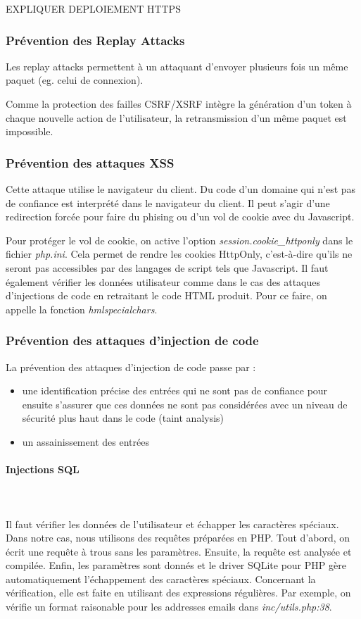\documentclass[a4paper]{article}
\begin{document}
EXPLIQUER DEPLOIEMENT HTTPS

\subsubsection{Prévention des \og Replay Attacks \fg}
Les replay attacks permettent à un attaquant d'envoyer plusieurs fois un
même paquet (eg. celui de connexion).

Comme la protection des failles CSRF/XSRF intègre la génération d'un
token à chaque nouvelle action de l'utilisateur, la retransmission d'un
même paquet est impossible.

\subsubsection{Prévention des attaques XSS}
 		
Cette attaque utilise le navigateur du client. Du code d'un domaine qui
n'est pas de confiance est interprété dans le navigateur du client.
Il peut s'agir d'une redirection forcée pour faire  du phising
ou d'un vol de cookie avec du Javascript.

Pour protéger le vol de cookie, on active l'option \textit{session.cookie\_httponly}
dans le fichier \textit{php.ini}. Cela permet de rendre les cookies HttpOnly,
c'est-à-dire qu'ils ne seront pas accessibles par des langages de script
tels que Javascript. Il faut également vérifier les données utilisateur
comme dans le cas des attaques d'injections de code en retraitant le code
HTML produit. Pour ce faire, on appelle la fonction \textit{hmlspecialchars}.
 		
\subsubsection{Prévention des attaques d'injection de code}
La prévention des attaques d'injection de code passe par :
\begin{itemize}
	\item une identification précise des entrées qui ne sont pas de
		confiance pour ensuite s'assurer que ces données ne sont pas
		considérées avec un niveau de sécurité plus haut dans le code
		(taint analysis) 
	\item un assainissement des entrées
\end{itemize}
		
\paragraph{Injections SQL}
~~\\
\\
Il faut vérifier les données de l'utilisateur et échapper les caractères spéciaux.
Dans notre cas, nous utilisons des requêtes préparées en PHP.
Tout d'abord, on écrit une requête à trous sans les paramètres. Ensuite, la
requête est analysée et compilée. Enfin, les paramètres sont donnés et le driver
SQLite pour PHP gère automatiquement l'échappement des caractères spéciaux.
Concernant la vérification, elle est faite en utilisant des expressions régulières.			
Par exemple, on vérifie un format raisonable pour les addresses emails dans
\textit{inc/utils.php:38}.
\end{document}

